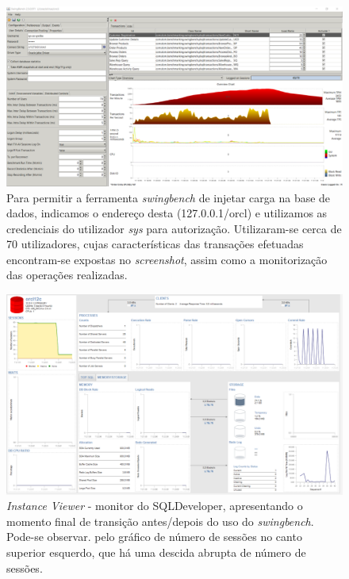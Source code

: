 \documentclass[a4paper]{article}
\begin{document}
\begin{figure}[H]
\centering
\includegraphics[scale=0.4]{html/swing.png}
\caption{Para permitir a ferramenta \emph{swingbench} de injetar carga na base de dados, indicamos o endereço desta (127.0.0.1/orcl) e utilizamos as credenciais do utilizador \emph{sys} para autorização. Utilizaram-se cerca de 70 utilizadores, cujas características das transações efetuadas encontram-se expostas no \emph{screenshot}, assim como a monitorização das operações realizadas.}
\end{figure}

\begin{figure}[H]
\centering
\includegraphics[scale=0.45]{html/sqldev.png}
\caption{\emph{Instance Viewer} - monitor do SQLDeveloper, apresentando o momento final de transição antes/depois do uso do \emph{swingbench}. Pode-se observar. pelo gráfico de número de sessões no canto superior esquerdo, que há uma descida abrupta de número de sessões.}
\end{figure}
\end{document}

